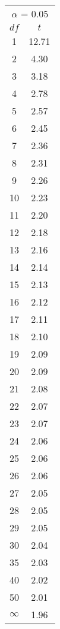 \begin{tabular}{|c|c|}\hline
 \multicolumn{2}{|c|}{$\alpha$ = 0.05}\\
$df$ & $t$ \\ \hline
1 & 12.71\\
2 & 4.30\\
3 & 3.18\\
4 & 2.78\\
5 & 2.57\\
6 & 2.45\\
7 & 2.36\\
8 & 2.31\\
9 & 2.26\\
10 & 2.23\\
11 & 2.20\\
12 & 2.18\\
13 & 2.16\\
14 & 2.14\\
15 & 2.13\\
16 & 2.12\\
17 & 2.11\\
18 & 2.10\\
19 & 2.09\\
20 & 2.09\\
21 & 2.08\\
22 & 2.07\\
23 & 2.07\\
24 & 2.06\\
25 & 2.06\\
26 & 2.06\\
27 & 2.05\\
28 & 2.05\\
29 & 2.05\\
30 & 2.04\\
35 & 2.03\\
40 & 2.02\\
50 & 2.01\\
$\infty$ & 1.96\\
\hline \end{tabular}

